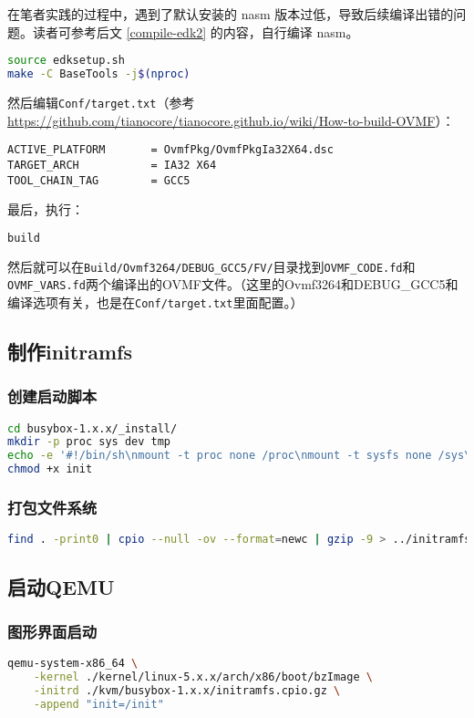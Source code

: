 在笔者实践的过程中，遇到了默认安装的 nasm 版本过低，导致后续编译出错的问题。读者可参考后文 \ref{compile-edk2} 的内容，自行编译 nasm。

\begin{lstlisting}[language=bash]
source edksetup.sh
make -C BaseTools -j$(nproc)
\end{lstlisting}
然后编辑\texttt{Conf/target.txt}（参考\url{https://github.com/tianocore/tianocore.github.io/wiki/How-to-build-OVMF}）：
\begin{lstlisting}
ACTIVE_PLATFORM       = OvmfPkg/OvmfPkgIa32X64.dsc
TARGET_ARCH           = IA32 X64
TOOL_CHAIN_TAG        = GCC5
\end{lstlisting}
最后，执行：
\begin{lstlisting}[language=bash]
build
\end{lstlisting}
然后就可以在\texttt{Build/Ovmf3264/DEBUG\_GCC5/FV/}目录找到\texttt{OVMF\_CODE.fd}和\texttt{OVMF\_VARS.fd}两个编译出的OVMF文件。（这里的Ovmf3264和DEBUG\_GCC5和编译选项有关，也是在\texttt{Conf/target.txt}里面配置。）

\subsection{制作initramfs}
\subsubsection{创建启动脚本}
\begin{lstlisting}[language=bash, language=bash, showstringspaces=false]
cd busybox-1.x.x/_install/
mkdir -p proc sys dev tmp
echo -e '#!/bin/sh\nmount -t proc none /proc\nmount -t sysfs none /sys\nmount -t tmpfs none /tmp\nmount -t devtmpfs none /dev\necho "Hello Linux!"\nexec /bin/sh' > init
chmod +x init
\end{lstlisting}

\subsubsection{打包文件系统}
\begin{lstlisting}[language=bash]
find . -print0 | cpio --null -ov --format=newc | gzip -9 > ../initramfs.cpio.gz
\end{lstlisting}

\subsection{启动QEMU}
\subsubsection{图形界面启动}
\begin{lstlisting}[language=bash]
qemu-system-x86_64 \
    -kernel ./kernel/linux-5.x.x/arch/x86/boot/bzImage \
    -initrd ./kvm/busybox-1.x.x/initramfs.cpio.gz \
    -append "init=/init"
\end{lstlisting}

